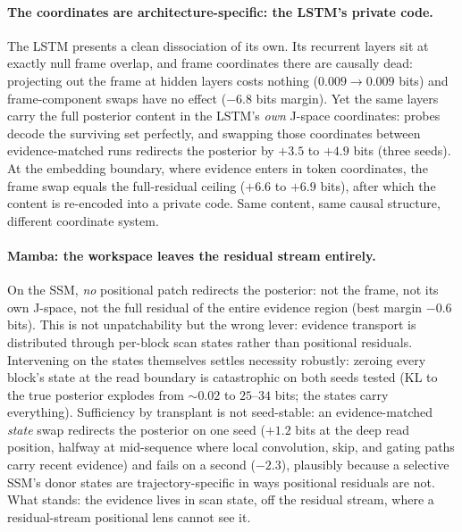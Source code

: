 \documentclass[11pt]{article}
\begin{document}
\paragraph{The coordinates are architecture-specific: the LSTM's
private code.} The LSTM presents a clean dissociation of its own.
Its recurrent layers sit at exactly null frame overlap, and frame
coordinates there are causally dead: projecting out the frame at hidden
layers costs nothing ($0.009 \to 0.009$ bits) and frame-component swaps
have no effect ($-6.8$ bits margin). Yet the same layers carry the full
posterior content in the LSTM's \emph{own} J-space coordinates: probes
decode the surviving set perfectly, and swapping those coordinates
between evidence-matched runs redirects the posterior by $+3.5$ to
$+4.9$ bits (three seeds). At the embedding boundary, where evidence
enters in token coordinates, the frame swap equals the full-residual
ceiling ($+6.6$ to $+6.9$ bits), after which the content is re-encoded
into a private code. Same content, same causal structure, different
coordinate system.

\paragraph{Mamba: the workspace leaves the residual stream entirely.}
On the SSM, \emph{no} positional patch redirects the posterior: not
the frame, not its own J-space, not the full residual of the entire
evidence region (best margin $-0.6$ bits). This is not
unpatchability but the wrong lever: evidence transport is distributed
through per-block scan states rather than positional residuals.
Intervening on the states themselves settles necessity robustly:
zeroing every block's state at the read boundary is catastrophic on
both seeds tested (KL to the true posterior explodes from ${\sim}0.02$
to $25$--$34$ bits; the states carry everything). Sufficiency by
transplant is not seed-stable: an evidence-matched \emph{state} swap
redirects the posterior on one seed ($+1.2$ bits at the deep read
position, halfway at mid-sequence where local convolution, skip, and
gating paths carry recent evidence) and fails on a second ($-2.3$),
plausibly because a selective SSM's donor states are
trajectory-specific in ways positional residuals are not. What stands:
the evidence lives in scan state, off the residual stream, where a
residual-stream positional lens cannot see it.
\end{document}
